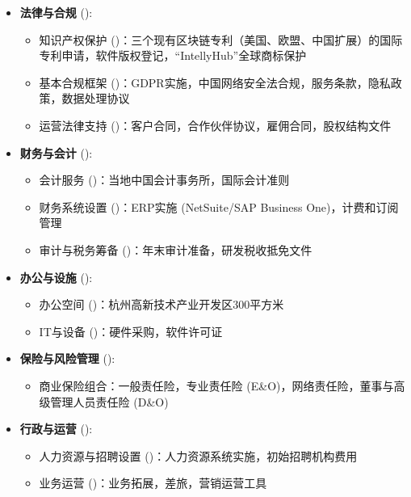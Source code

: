 \documentclass[11点, A4纸, 单面]{article}
\begin{document}
\begin{itemize}
    \item \textbf{法律与合规} ():
    \begin{itemize}
        \item 知识产权保护 ()：三个现有区块链专利（美国、欧盟、中国扩展）的国际专利申请，软件版权登记，“IntellyHub”全球商标保护
        \item 基本合规框架 ()：GDPR实施，中国网络安全法合规，服务条款，隐私政策，数据处理协议
        \item 运营法律支持 ()：客户合同，合作伙伴协议，雇佣合同，股权结构文件
    \end{itemize}
    
    \item \textbf{财务与会计} ():
    \begin{itemize}
        \item 会计服务 ()：当地中国会计事务所，国际会计准则
        \item 财务系统设置 ()：ERP实施 (NetSuite/SAP Business One)，计费和订阅管理
        \item 审计与税务筹备 ()：年末审计准备，研发税收抵免文件
    \end{itemize}
    
    \item \textbf{办公与设施} ():
    \begin{itemize}
        \item 办公空间 ()：杭州高新技术产业开发区300平方米
        \item IT与设备 ()：硬件采购，软件许可证
    \end{itemize}
    
    \item \textbf{保险与风险管理} ():
    \begin{itemize}
        \item 商业保险组合：一般责任险，专业责任险 (E\&O)，网络责任险，董事与高级管理人员责任险 (D\&O)
    \end{itemize}
    
    \item \textbf{行政与运营} ():
    \begin{itemize}
        \item 人力资源与招聘设置 ()：人力资源系统实施，初始招聘机构费用
        \item 业务运营 ()：业务拓展，差旅，营销运营工具
    \end{itemize}
\end{itemize}
\end{document}
